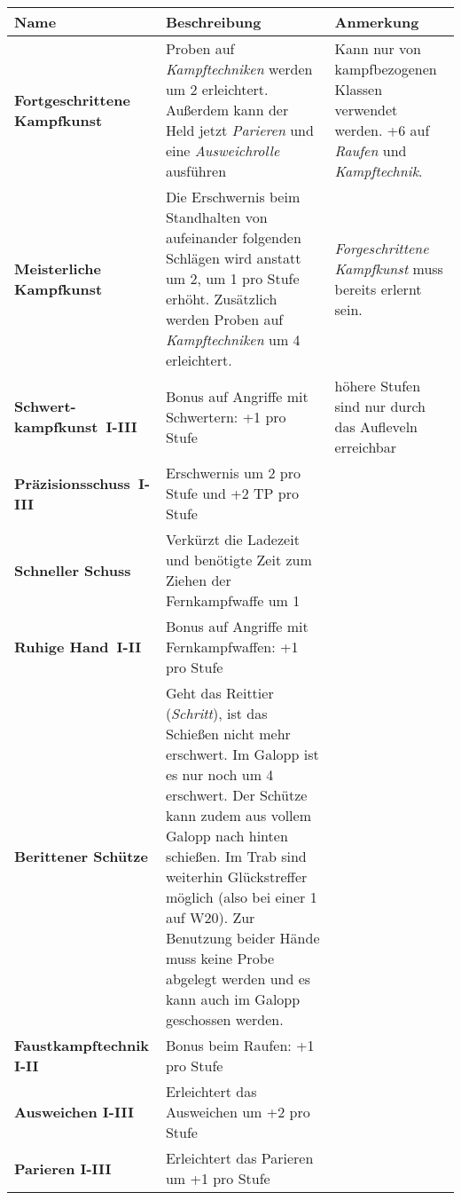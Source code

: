 \begin{longtable}{| p{4cm} | p{8cm} | p{3cm} |}
\hline
\textbf{Name} & \textbf{Beschreibung} & \textbf{Anmerkung} \\

\hline
\textbf{Fortgeschrittene Kampfkunst} & Proben auf \textit{Kampftechniken} werden um 2 erleichtert. Außerdem kann der Held jetzt \textit{Parieren} und eine \textit{Ausweichrolle} ausführen & Kann nur von kampfbezogenen Klassen verwendet werden. +6 auf \textit{Raufen} und \textit{Kampftechnik}. \\

\hline 
\textbf{Meisterliche Kampfkunst} & Die Erschwernis beim Standhalten von aufeinander folgenden Schlägen wird anstatt um 2, um 1 pro Stufe erhöht. Zusätzlich werden Proben auf \textit{Kampftechniken} um 4 erleichtert. & \textit{Forgeschrittene Kampfkunst} muss bereits erlernt sein. \\

\hline
\textbf{Schwert-kampfkunst~I-III} & Bonus auf Angriffe mit Schwertern: +1 pro Stufe & höhere Stufen sind nur durch das Aufleveln erreichbar \\

\hline
\textbf{Präzisionsschuss~I-III} & Erschwernis um 2 pro Stufe und +2 TP pro Stufe & \\

\hline
\textbf{Schneller Schuss} & Verkürzt die Ladezeit und benötigte Zeit zum Ziehen der Fernkampfwaffe um 1 & \\

\hline
\textbf{Ruhige Hand~I-II} & Bonus auf Angriffe mit Fernkampfwaffen: +1 pro Stufe & \\

\hline
\textbf{Berittener Schütze} & Geht das Reittier (\textit{Schritt}), ist das Schießen nicht mehr erschwert. Im Galopp ist es nur noch um 4 erschwert. Der Schütze kann zudem aus vollem Galopp nach hinten schießen. Im Trab sind weiterhin Glückstreffer möglich (also bei einer 1 auf W20). Zur Benutzung beider Hände muss keine Probe abgelegt werden und es kann auch im Galopp geschossen werden. & \\

\hline
\textbf{Faustkampftechnik I-II} & Bonus beim Raufen: +1 pro Stufe & \\

\hline
\textbf{Ausweichen I-III} & Erleichtert das Ausweichen um +2 pro Stufe & \\

\hline
\textbf{Parieren I-III} & Erleichtert das Parieren um +1 pro Stufe & \\


\end{longtable}
